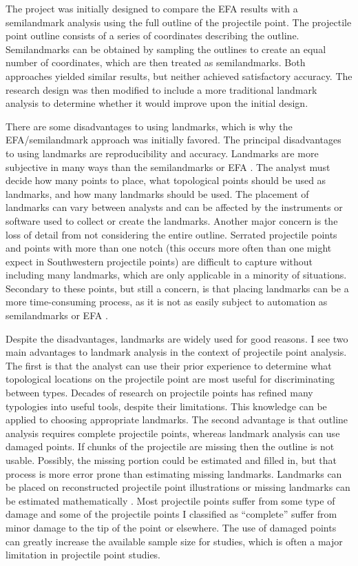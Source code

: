 \documentclass[PCJ,Unicode,screen,mode=plain]{cedram}
\begin{document}
The project was initially designed to compare the EFA results with a semilandmark analysis using the full outline of the projectile point. The projectile point outline consists of a series of coordinates describing the outline. Semilandmarks can be obtained by sampling the outlines to create an equal number of coordinates, which are then treated as semilandmarks. Both approaches yielded similar results, but neither achieved satisfactory accuracy. The research design was then modified to include a more traditional landmark analysis to determine whether it would improve upon the initial design.

There are some disadvantages to using landmarks, which is why the EFA/semilandmark approach was initially favored. The principal disadvantages to using landmarks are reproducibility and accuracy. Landmarks are more subjective in many ways than the semilandmarks or EFA \autocite[see][205]{Shott2010-fn}. The analyst must decide how many points to place, what topological points should be used as landmarks, and how many landmarks should be used. The placement of landmarks can vary between analysts and can be affected by the instruments or software used to collect or create the landmarks. Another major concern is the loss of detail from not considering the entire outline. Serrated projectile points and points with more than one notch (this occurs more often than one might expect in Southwestern projectile points) are difficult to capture without including many landmarks, which are only applicable in a minority of situations. Secondary to these points, but still a concern, is that placing landmarks can be a more time-consuming process, as it is not as easily subject to automation as semilandmarks or EFA \autocite[although see][ for one of several examples of automation]{Palaniswamy2010-sl}.

Despite the disadvantages, landmarks are widely used for good reasons. I see two main advantages to landmark analysis in the context of projectile point analysis. The first is that the analyst can use their prior experience to determine what topological locations on the projectile point are most useful for discriminating between types. Decades of research on projectile points has refined many typologies into useful tools, despite their limitations. This knowledge can be applied to choosing appropriate landmarks. The second advantage is that outline analysis requires complete projectile points, whereas landmark analysis can use damaged points. If chunks of the projectile are missing then the outline is not usable. Possibly, the missing portion could be estimated and filled in, but that process is more error prone than estimating missing landmarks. Landmarks can be placed on reconstructed projectile point illustrations or missing landmarks can be estimated mathematically \autocite{Gunz2009-yb}. Most projectile points suffer from some type of damage and some of the projectile points I classified as ``complete'' suffer from minor damage to the tip of the point or elsewhere. The use of damaged points can greatly increase the available sample size for studies, which is often a major limitation in projectile point studies.
\end{document}
